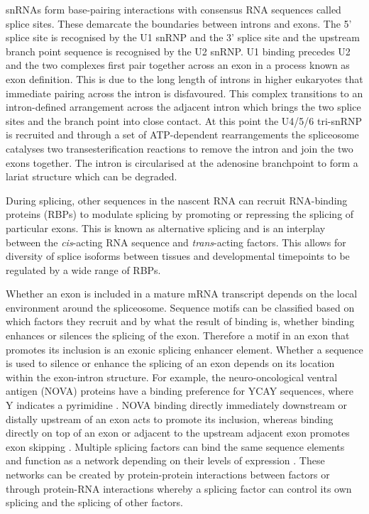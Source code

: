snRNAs form base-pairing interactions with consensus RNA sequences called splice sites. 
These demarcate the boundaries between introns and exons. 
The 5' splice site is recognised by the U1 snRNP and the 3' splice site and the upstream branch point sequence is recognised by the U2 snRNP.
U1 binding precedes U2 and the two complexes first pair together across an exon in a process known as exon definition. 
This is due to the long length of introns in higher eukaryotes that immediate pairing across the intron is disfavoured.
This complex transitions to an intron-defined arrangement across the adjacent intron which brings the two splice sites and the branch point into close contact.
At this point the U4/5/6 tri-snRNP is recruited and through a set of ATP-dependent rearrangements the spliceosome catalyses two transesterification reactions to remove the intron and join the two exons together.
The intron is circularised at the adenosine branchpoint to form a lariat structure which can be degraded.

During splicing, other sequences in the nascent RNA can recruit RNA-binding proteins (RBPs) to modulate splicing by promoting or repressing the splicing of particular exons.
This is known as alternative splicing and is an interplay between the \textit{cis}-acting RNA sequence and \textit{trans}-acting factors.
This allows for diversity of splice isoforms between tissues and developmental timepoints to be regulated by a wide range of RBPs.

Whether an exon is included in a mature mRNA transcript depends on the local environment around the spliceosome.
Sequence motifs can be classified based on which factors they recruit and by what the result of binding is, whether binding enhances or silences the splicing of the exon.
Therefore a motif in an exon that promotes its inclusion is an exonic splicing enhancer element. 
Whether a sequence is used to silence or enhance the splicing of an exon depends on its location within the exon-intron structure.
For example, the neuro-oncological ventral antigen (NOVA) proteins have a binding preference for YCAY sequences, where Y indicates a pyrimidine \citep{Buckanovich1996,Jensen2000}.
NOVA binding directly immediately downstream or distally upstream of an exon acts to promote its inclusion, whereas binding directly on top of an exon or adjacent to the upstream adjacent exon promotes exon skipping \citep{Ule2006}.
Multiple splicing factors can bind the same sequence elements and function as a network depending on their levels of expression \citep{Wang2013a}.
These networks can be created by protein-protein interactions between factors or through protein-RNA interactions whereby a splicing factor can control its own splicing and the splicing of other factors. 

